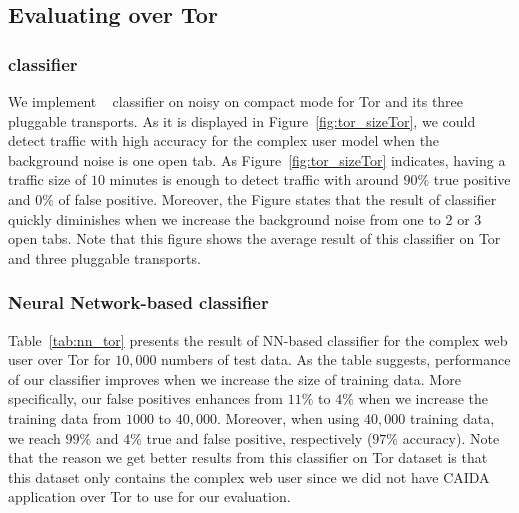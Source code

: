 \subsection{Evaluating \bc over Tor}
\subsubsection{ classifier}
We implement ~ classifier on noisy \bc on compact mode for Tor and its three pluggable transports. As it is displayed in Figure~\ref{fig:tor_sizeTor}, we could detect \bc traffic with high accuracy for the complex user model when the background noise is one open tab. As Figure~\ref{fig:tor_sizeTor} indicates, having a traffic size of $10$ minutes is
enough to detect \bc traffic with around $90\%$ true positive and $0\%$ of false positive. Moreover, the Figure states that the result of classifier quickly diminishes when we increase the background noise from one to $2$ or $3$ open tabs.
Note that this figure shows the average result of this classifier on Tor and three pluggable transports.
\subsubsection{Neural Network-based classifier}
Table~\ref{tab:nn_tor} presents the result of NN-based classifier for the complex web user over Tor for $10,000$ numbers of test data. As the table suggests, performance of our classifier improves when we increase the size of training data. More specifically, our false positives enhances from $11\%$ to $4\%$ when we increase the training data from $1000$ to $40,000$. Moreover, when using $40,000$ training data, we reach $99\%$ and $4\%$ true and false positive, respectively ($97\%$ accuracy). Note that the reason we get better results from this classifier on Tor dataset is that this dataset only contains the complex web user since we did not have CAIDA application over Tor to use for our evaluation.
\begin{comment}
\begin{table}[h!]
  \begin{center}
     \caption{Result of Neural Network classifier for Tor dataset}
    \label{tab:nn_tor}
    \begin{tabular}{c|c|c|c}
    \kern 0.5pc \shortstack{ Training \\Size}& \shortstack{False Positive\\ ($\%$)} &\shortstack{True Positive\\ ($\%$)}&\shortstack{Accuracy \\($\%$)} \kern 0.5pc\\
      \hline
	$1000$&$11$ &$98 $  & $93$\\
	$5000$&$6$& $98$  & $96$\\
	$10,000$&$3$& $98$  &$ 97$\\
	$40,000$&$4$& $99$   & $97$\\
    \end{tabular}
  \end{center}
\end{table}
\end{comment}

